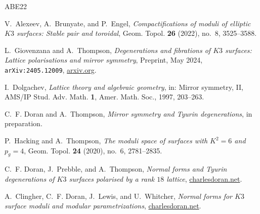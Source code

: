 \documentclass[11pt]{amsart}
\theoremstyle{definition}
\theoremstyle{remark}
\begin{document}
\begin{thebibliography}{ABE22}

V.~Alexeev, A.~Brunyate, and P.~Engel,
\emph{Compactifications of moduli of elliptic \(K3\) surfaces: Stable pair and
toroidal}, Geom. Topol. \textbf{26} (2022), no.~8, 3525--3588.

L.~Giovenzana and A.~Thompson,
\emph{Degenerations and fibrations of \(K3\) surfaces: Lattice polarisations and
mirror symmetry}, Preprint, May 2024, \texttt{arXiv:2405.12009},
\href{https://arxiv.org/html/2405.12009}{arxiv.org}.

I.~Dolgachev,
\emph{Lattice theory and algebraic geometry}, in: Mirror symmetry, II,
AMS/IP Stud. Adv. Math. \textbf{1}, Amer. Math. Soc., 1997, 203--263.

C.~F. Doran and A.~Thompson,
\emph{Mirror symmetry and Tyurin degenerations}, in preparation.

P.~Hacking and A.~Thompson,
\emph{The moduli space of surfaces with \(K^2=6\) and \(p_g=4\)},
Geom. Topol. \textbf{24} (2020), no.~6, 2781--2835.

C.~F. Doran, J.~Prebble, and A.~Thompson,
\emph{Normal forms and Tyurin degenerations of \(K3\) surfaces polarised by a
rank \(18\) lattice},
\href{https://www.charlesdoran.net/uploads/6/7/5/1/6751141/2311.10394.pdf}{charlesdoran.net}.

A.~Clingher, C.~F. Doran, J.~Lewis, and U.~Whitcher,
\emph{Normal forms for \(K3\) surface moduli and modular parametrizations},
\href{https://www.charlesdoran.net/uploads/6/7/5/1/6751141/40_normal_forms_k3_surface_moduli_and_modular_parametrizations_2009.pdf}{charlesdoran.net}.

\end{thebibliography}
\end{document}
